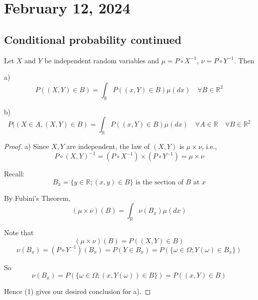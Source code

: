 \newpage
\section{February 12, 2024}
\subsection{Conditional probability continued}

\begin{theorem}
Let \(X\) and \(Y\) be independent random variables and \(\mu = P \circ X^{-1}\), \(\nu = P \circ Y^{-1}\). Then

a)
\[
P((X,Y) \in B) = \int_{\mathbb{R}} P((x,Y) \in B) \mu(dx) \quad \forall B \in \mathbb{R}^2 \tag{2}
\]

b)
\[
P((X \in A, (X,Y) \in B) = \int_{\mathbb{R}} P((x,Y) \in B) \mu(dx) \quad \forall A \in \mathbb{R} \quad \forall B \in \mathbb{R}^2 \tag{4}
\]
\end{theorem}
\begin{proof}
a) Since \(X, Y\) are independent, the law of \((X, Y)\) is \(\mu \times \nu\), i.e.,
\[
P \circ (X, Y)^{-1} = (P \circ X^{-1}) \times (P \circ Y^{-1}) = \mu \times \nu
\]

Recall:
\[
B_x = \{y \in \mathbb{R}; (x, y) \in B\} \text{ is the section of } B \text{ at } x
\]

By Fubini's Theorem,
\[
(\mu \times \nu)(B) = \int_{\mathbb{R}} \nu(B_x) \mu(dx) \tag{1}
\]

Note that
\[
(\mu \times \nu)(B) = P((X, Y) \in B)
\]
\[
\nu(B_x) = (P \circ Y^{-1})(B_x) = P(Y \in B_x) = P(\{\omega \in \Omega; Y(\omega) \in B_x\})
\]

So
\[
\nu(B_x) = P(\{\omega \in \Omega; (x, Y(\omega)) \in B\}) = P((x, Y) \in B)
\]

Hence (1) gives our desired conclusion for a).
\end{proof}


